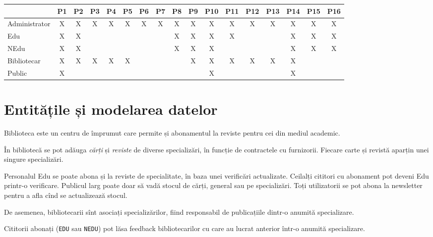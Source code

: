 \begin{center}
    \small
    \begin{tabular}{|l|c|c|c|c|c|c|c|c|c|c|c|c|c|c|c|c|}
        \hline
    & P1 & P2 & P3 & P4 & P5 & P6 & P7 & P8 & P9 & P10 & P11 & P12 & P13 & P14 & P15 & P16 \\
    \hline \hline
        Administrator & X & X & X & X & X & X & X & X & X & X & X & X & X & X & X & X \\
        \hline
        Edu & X & X & & & & & & X & X & X & X & & & X & X & X \\
        \hline
        NEdu & X & X & & & & & & X & X & X & & & & X & X & X \\
        \hline
        Bibliotecar & X & X & X & X & X & & & & X & X & X & X & X & X & & \\
        \hline
        Public & X & & & & & & & & & X & & & & X & & \\
        \hline
    \end{tabular}
\end{center}


\section{Entitățile și modelarea datelor}
\label{sec:ent-model}

Biblioteca este un centru de împrumut care permite și abonamentul la reviste
pentru cei din mediul academic.

În bibliotecă se pot adăuga \emph{cărți} și \emph{reviste} de diverse
specializări, în funcție de contractele cu furnizorii. Fiecare
carte și revistă aparțin unei singure specializări.

Personalul Edu se poate abona și la reviste de specialitate, în baza
unei verificări actualizate. Ceilalți cititori cu abonament pot deveni
Edu printr-o verificare. Publicul larg poate doar să vadă stocul
de cărți, general sau pe specializări. Toți utilizatorii se pot abona
la newsletter pentru a afla cînd se actualizează stocul.

De asemenea, bibliotecarii sînt asociați specializărilor, fiind
responsabil de publicațiile dintr-o anumită specializare.

Cititorii abonați (\texttt{EDU} sau \texttt{NEDU}) pot lăsa feedback
bibliotecarilor cu care au lucrat anterior într-o anumită specializare.

